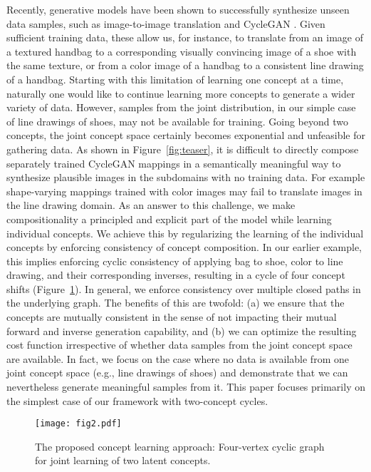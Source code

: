 \documentclass[10pt,twocolumn,letterpaper]{article}
\begin{document}
Recently, generative models have been shown to successfully synthesize unseen data samples, such as image-to-image translation and CycleGAN \cite{CycleGAN,DiscoGAN}. Given sufficient training data, these allow us, for instance, to translate from an image of a textured handbag to a corresponding visually convincing image of a shoe with the same texture, or from a color image of a handbag to a consistent line drawing of a handbag. Starting with this limitation of learning one concept at a time, naturally one would like to continue learning more concepts to generate a wider variety of data. However, samples from the joint distribution, in our simple case of line drawings of shoes, may not be available for training. Going beyond two concepts, the joint concept space certainly becomes exponential and unfeasible for gathering data. As shown in Figure~\ref{fig:teaser}, it is difficult to directly compose separately trained CycleGAN mappings in a semantically meaningful way to synthesize plausible images in the subdomains with no training data. For example shape-varying mappings trained with color images may fail to translate images in the line drawing domain. As an answer to this challenge, we make compositionality a principled and explicit part of the model while learning individual concepts. We achieve this by regularizing the learning of the individual concepts by enforcing consistency of concept composition. In our earlier example, this implies enforcing cyclic consistency of applying bag to shoe, color to line drawing, and their corresponding inverses, resulting in a cycle of four concept shifts (Figure~\ref{fig:cyclicmodel}). In general, we enforce consistency over multiple closed paths in the underlying graph. The benefits of this are twofold: (a) we ensure that the concepts are mutually consistent in the sense of not impacting their mutual forward and inverse generation capability, and (b) we can optimize the resulting cost function irrespective of whether data samples from the joint concept space are available. In fact, we focus on the case where no data is available from one joint concept space (e.g., line drawings of shoes) and demonstrate that we can nevertheless generate meaningful samples from it. This paper focuses primarily on the simplest case of our framework with two-concept cycles. 

\begin{figure}[!t]
\begin{center}
\texttt{[image: fig2.pdf]}
\end{center}
   \caption{The proposed concept learning approach: Four-vertex cyclic graph for joint learning of two latent concepts.}
\vspace{-1.5em}
\label{fig:cyclicmodel}
\end{figure}
\end{document}
